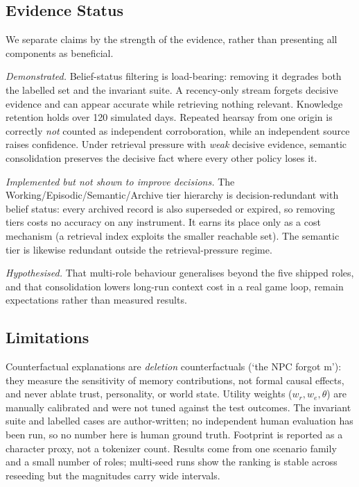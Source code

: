\documentclass[conference]{IEEEtran}
\begin{document}
\subsection{Evidence Status}
We separate claims by the strength of the evidence, rather than presenting all components as beneficial.

\textit{Demonstrated.} Belief-status filtering is load-bearing: removing it degrades both the labelled set and the invariant suite. A recency-only stream forgets decisive evidence and can appear accurate while retrieving nothing relevant. Knowledge retention holds over 120 simulated days. Repeated hearsay from one origin is correctly \emph{not} counted as independent corroboration, while an independent source raises confidence. Under retrieval pressure with \emph{weak} decisive evidence, semantic consolidation preserves the decisive fact where every other policy loses it.

\textit{Implemented but not shown to improve decisions.} The Working/Episodic/Semantic/Archive tier hierarchy is decision-redundant with belief status: every archived record is also superseded or expired, so removing tiers costs no accuracy on any instrument. It earns its place only as a cost mechanism (a retrieval index exploits the smaller reachable set). The semantic tier is likewise redundant outside the retrieval-pressure regime.

\textit{Hypothesised.} That multi-role behaviour generalises beyond the five shipped roles, and that consolidation lowers long-run context cost in a real game loop, remain expectations rather than measured results.

\subsection{Limitations}
Counterfactual explanations are \emph{deletion} counterfactuals (`the NPC forgot m'): they measure the sensitivity of memory contributions, not formal causal effects, and never ablate trust, personality, or world state. Utility weights ($w_r, w_e, \theta$) are manually calibrated and were not tuned against the test outcomes. The invariant suite and labelled cases are author-written; no independent human evaluation has been run, so no number here is human ground truth. Footprint is reported as a character proxy, not a tokenizer count. Results come from one scenario family and a small number of roles; multi-seed runs show the ranking is stable across reseeding but the magnitudes carry wide intervals.
\end{document}
